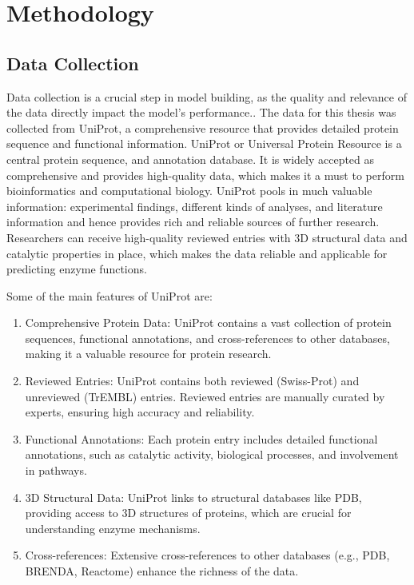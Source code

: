 \section{Methodology}

\subsection{Data Collection}
\label{sec:Data Collection}

Data collection is a crucial step in model building, as the quality and relevance of the data directly impact the model’s performance.. The data for this thesis was collected from UniProt, a comprehensive resource that provides detailed protein sequence and functional information. UniProt or Universal Protein Resource is a central protein sequence, and annotation database. It is widely accepted as comprehensive and provides high-quality data, which makes it a must to perform bioinformatics and computational biology. UniProt pools in much valuable information: experimental findings, different kinds of analyses, and literature information and hence provides rich and reliable sources of further research. Researchers can receive high-quality reviewed entries with 3D structural data and catalytic properties in place, which makes the data reliable and applicable for predicting enzyme functions. \autocite{uniprotconsortiumUniProtUniversalProtein2021}

Some of the main features of UniProt are:

\begin{enumerate}
    \item Comprehensive Protein Data: UniProt contains a vast collection of protein sequences, functional annotations, and cross-references to other databases, making it a valuable resource for protein research.
    \item Reviewed Entries: UniProt contains both reviewed (Swiss-Prot) and unreviewed (TrEMBL) entries. Reviewed entries are manually curated by experts, ensuring high accuracy and reliability.
    \item Functional Annotations: Each protein entry includes detailed functional annotations, such as catalytic activity, biological processes, and involvement in pathways.
    \item 3D Structural Data: UniProt links to structural databases like PDB, providing access to 3D structures of proteins, which are crucial for understanding enzyme mechanisms.
    \item Cross-references: Extensive cross-references to other databases (e.g., PDB, BRENDA, Reactome) enhance the richness of the data.
\end{enumerate}

